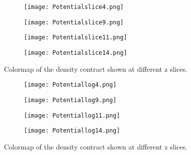 \begin{figure}[ht!]
\begin{center}
        \begin{subfigure}{.49\textwidth}
      \centering
      \texttt{[image: Potentialslice4.png]}
    \end{subfigure}
    \vspace{-10pt}
    \begin{subfigure}{.49\textwidth}
      \centering
      \texttt{[image: Potentialslice9.png]}
    \end{subfigure}
     \vspace{-10pt}
    \begin{subfigure}{.49\textwidth}
      \centering
      \texttt{[image: Potentialslice11.png]}
    \end{subfigure}
     \vspace{-10pt}
    \begin{subfigure}{.49\textwidth}
      \centering
      \texttt{[image: Potentialslice14.png]}
    \end{subfigure}
    \caption{Colormap of the density contract shown at different z slices.}
    \label{fig:Potentialslice}
\end{center}
\end{figure}

\begin{figure}[ht!]
\begin{center}
        \begin{subfigure}{.49\textwidth}
      \centering
      \texttt{[image: Potentiallog4.png]}
    \end{subfigure}
    \vspace{-10pt}
    \begin{subfigure}{.49\textwidth}
      \centering
      \texttt{[image: Potentiallog9.png]}
    \end{subfigure}
     \vspace{-10pt}
    \begin{subfigure}{.49\textwidth}
      \centering
      \texttt{[image: Potentiallog11.png]}
    \end{subfigure}
     \vspace{-10pt}
    \begin{subfigure}{.49\textwidth}
      \centering
      \texttt{[image: Potentiallog14.png]}
    \end{subfigure}
    \caption{Colormap of the density contract shown at different z slices.}
    \label{fig:Potentiallogslice}
\end{center}
\end{figure}











